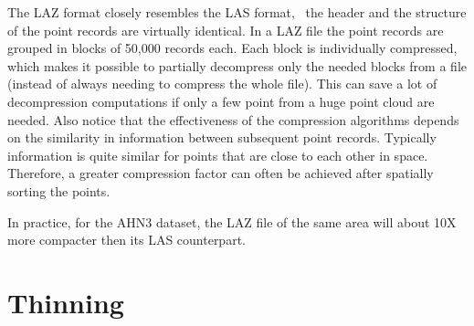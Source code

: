 The LAZ format closely resembles the LAS format, \ie\ the header and the structure of the point records are virtually identical.
In a LAZ file the point records are grouped in blocks of 50,000 records each.
Each block is individually compressed, which makes it possible to partially decompress only the needed blocks from a file (instead of always needing to compress the whole file).
This can save a lot of decompression computations if only a few point from a huge point cloud are needed.
Also notice that the effectiveness of the compression algorithms depends on the similarity in information between subsequent point records.
Typically information is quite similar for points that are close to each other in space.
Therefore, a greater compression factor can often be achieved after spatially sorting the points.

In practice, for the AHN3 dataset, the LAZ file of the same area will about 10X more compacter then its LAS counterpart.


%
\section{Thinning}


